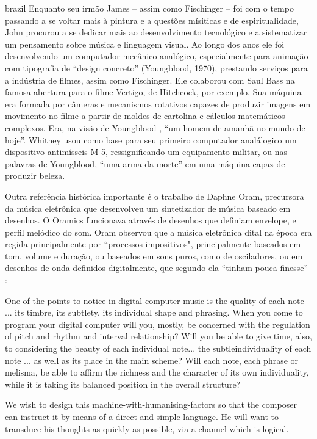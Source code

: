 \begin{otherlanguage*}{brazil}
Enquanto seu irmão James – assim como Fischinger – foi com o tempo passando a se voltar mais à pintura e a questões mísiticas e de espiritualidade, John procurou a se dedicar mais ao desenvolvimento tecnológico e a sistematizar um pensamento sobre música e linguagem visual. Ao longo dos anos ele foi desenvolvendo um computador mecânico analógico, especialmente para animação com tipografia de ``design concreto'' (Youngblood, 1970), prestando serviços para a indústria de filmes, assim como Fischinger. Ele colaborou com Saul Bass na famosa abertura para o filme Vertigo, de Hitchcock, por exemplo. Sua máquina era formada por câmeras e mecanismos rotativos capazes de produzir imagens em movimento no filme a partir de moldes de cartolina e cálculos matemáticos complexos. Era, na visão de Youngblood \cite{Youngblood1970}, ``um homem de amanhã no mundo de hoje''. Whitney usou como base para seu primeiro computador analálogico um dispositivo antimísseis M-5, ressignificando um equipamento militar, ou nas palavras de Youngblood, ``uma arma da morte'' em uma máquina capaz de produzir beleza.

Outra referência histórica importante é o trabalho de Daphne Oram, precursora da música eletrônica que desenvolveu um sintetizador de música baseado em desenhos. O Oramics funcionava através de desenhos que definiam envelope, e perfil melódico do som. Oram observou que a música eletrônica dital na época era regida principalmente por ``processos impositivos", principalmente baseados em tom, volume e duração, ou baseados em sons puros, como de osciladores, ou em desenhos de onda definidos digitalmente, que segundo ela ``tinham pouca finesse'' \cite[101]{Oram1972}: 

\begin{citacao}
One of the points to notice in digital computer music is the
quality of each note ... its timbre, its subtlety, its individual shape and phrasing. When you come to program your digital computer will you, mostly, be concerned with the regulation of pitch and rhythm and interval relationship? Will you be able to give time, also, to considering the beauty of each individual note... the subtleindividuality of each note ... as well as its place in the main scheme? Will each note, each phrase or melisma, be able to affirm the richness and the character of its own individuality, while it is taking its balanced position in the overall structure? 

We wish to design this machine-with-humanising-factors so that the composer can instruct it by means of a direct and simple language. He will want to transduce his thoughts as quickly as possible, via a channel which is logical. \cite[97]{Oram1972}
\end{citacao}


\end{otherlanguage*}
